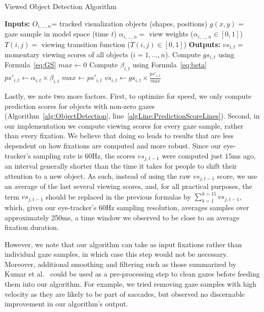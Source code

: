 \begin{algorithm}
\caption{Viewed Object Detection Algorithm}
\label{alg:ObjectDetection}
\begin{algorithmic}[1]
\State \textbf{Inputs: } 
\Statex $O_{i, \ldots, n}$= tracked visualization objects (shapes, positions)
\Statex $g(x,y) = $ gaze sample in model space (time $t$)
\Statex $\alpha_{i, \ldots, n} = $ view weights ($\alpha_{i, \ldots, n} \in [0,1]$)
\Statex $T(i,j) = $ viewing transition function ($T(i,j) \in [0,1]$)
\State \textbf{Outputs:}
\Statex $vs_{i,t} = $ momentary viewing scores of all objects ($i = 1, \ldots, n$). 
	\State Compute $gs_{i,t}$	using Formula~\ref{eq:GS}
\EndFor
\State $max \gets 0$
	 \label{algLine:PredictionScoreLines}
		\State Compute $\beta_{i,t}$	using Formula~\ref{eq:beta}
		\State $ps'_{i,t} \gets \alpha_{i,t} \times \beta_{i,t}$
			\State $max \gets ps'_{i,t}$
		\EndIf
	\EndIf
\EndFor
{}
	\State $vs_{i,t} \gets gs_{i,t} \times \frac{ps'_{i,t}}{max} $
\EndFor
\end{algorithmic}
\end{algorithm}

Lastly, we note two more factors. First, to optimize for speed, we only compute prediction scores for objects with non-zero gazes (Algorithm~\ref{alg:ObjectDetection}, line~\ref{algLine:PredictionScoreLines}). Second, in our implementation we compute viewing scores for every gaze sample, rather than every fixation. We believe that doing so leads to results that are less dependent on how fixations are computed and more robust. Since our eye-tracker's sampling rate is $60$Hz, the scores $vs_{j, t-1}$ were computed just $15$ms ago, an interval generally shorter than the time it takes for people to shift their attention to a new object. As such, instead of using the raw $vs_{j,t-1}$ score, we use an average of the last several viewing scores, and, for all practical purposes, the term $vs_{j,t-1}$ should be replaced in the previous formulas by $ \sum_{k=1}^{k=15}{vs_{j,t-1}}$, which, given our eye-tracker's 60Hz sampling resolution, averages samples over approximately 250ms, a time window we observed to be close to an average fixation duration.   

However, we note that our algorithm can take as input fixations rather than individual gaze samples, in which case this step would not be necessary. Moreover, additional smoothing and filtering such as those summarized by Kumar et al.~\cite{kumar2008improving} could be used as a pre-processing step to clean gazes before feeding them into our algorithm. For example, we tried removing gaze samples with high velocity as they are likely to be part of saccades, but observed no discernable improvement in our algorithm's output. 


